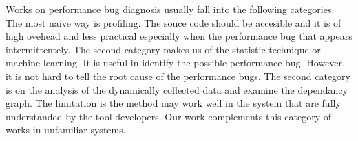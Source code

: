 Works on performance bug diagnosis usually fall into the following categories.
The most naive way is profiling.
The souce code should be accesible and it is of high ovehead and less practical especially when the performance bug that appears intermittentely.
The second category makes us of the statistic technique or machine learning.
It is useful in identify the possible performance bug.
However, it is not hard to tell the root cause of the performance bugs.
The second category is on the analysis of the dynamically collected data and examine the dependancy graph.
The limitation is the method may work well in the system that are fully understanded by the tool developers.
Our work complements this category of works in unfamiliar systems.
